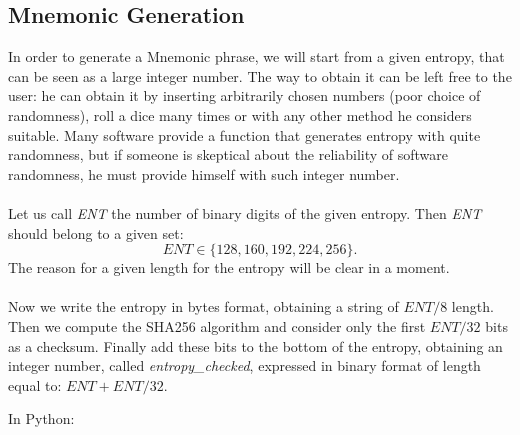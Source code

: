 \subsection{Mnemonic Generation}
In order to generate a Mnemonic phrase, we will start from a given entropy, that can be seen as a large integer number. The way to obtain it can be left free to the user: he can obtain it by inserting arbitrarily chosen numbers (poor choice of randomness), roll a dice many times or with any other method he considers suitable. Many software provide a function that generates entropy with quite randomness, but if someone is skeptical about the reliability of software randomness, he must provide himself with such integer number.
\\ \\
Let us call \textit{ENT} the number of binary digits of the given entropy. Then \textit{ENT} should belong to a given set:
\begin{equation*}
	ENT \in \{128,160,192,224,256\}.
\end{equation*}
The reason for a given length for the entropy will be clear in a moment.
\\ \\
Now we write the entropy in bytes format, obtaining a string of $ENT/8$ length. Then we compute the SHA256 algorithm and consider only the first $ENT/32$ bits as a checksum. Finally add these bits to the bottom of the entropy, obtaining an integer number, called \textit{entropy\_checked}, expressed in binary format of length equal to: $ENT+ENT/32$.

\begin{flushleft}
	In Python:
\end{flushleft}

